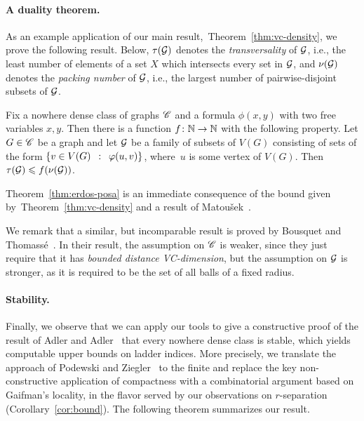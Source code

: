 \paragraph{A duality theorem.}
As an example application of our main result,~Theorem~\ref{thm:vc-density}, we prove the following
 result. Below, $\tau(\cal G)$ denotes the \emph{transversality} of $\cal G$, i.e., the least number of elements of a set $X$ which intersects every set in $\cal G$,
and $\nu(\cal G)$ denotes the \emph{packing number} of $\cal G$, i.e., the largest number of pairwise-disjoint subsets of $\cal G$.
 
\setcounter{ep}{\value{theorem}}
\begin{theorem}\label{thm:erdos-posa}
	Fix a nowhere dense class of graphs $\CCC$ and a 
	formula $\phi(x,y)$ with two free variables $x,y$.
	Then there is a function $f\from \N\to\N$ with the following property.
	Let $G\in \CCC$ be a graph and let $\cal G$
	be a family of subsets of $V(G)$ consisting of sets of the form $\setof{v\in V(G)}{\phi(u, v)}$, where~$u$ is some vertex of $V(G)$.
Then~$\tau({\cal G})\le f(\nu(\cal G))$.
\end{theorem}
\noindent Theorem~\ref{thm:erdos-posa} is an immediate consequence of the bound given by~Theorem~\ref{thm:vc-density} and a result of Matou{\v s}ek~\cite{Matousek:2004:BVI:1005787.1005789}.

We remark that a similar, but incomparable result
is proved by Bousquet and Thomass{\'e}~\cite{BousquetT15}.
In their result, the assumption on $\CCC$ is weaker, since they just require that it has \emph{bounded distance VC-dimension}, 
but the assumption on   $\cal G$ is stronger, as it is required to be the set of all balls of a fixed radius.





\paragraph{Stability.}
Finally, we observe that we can apply our  tools to give a constructive proof of the result of Adler and Adler~\cite{adler2014interpreting}
that every nowhere dense class is stable, which yields computable upper bounds on ladder indices.
More precisely, we translate the approach of Podewski and Ziegler~\cite{podewski1978stable} to the finite
and replace the key non-constructive application of compactness with a combinatorial argument based on Gaifman's locality,
in the flavor served by our observations on $r$-separation (Corollary~\ref{cor:bound}).
The following theorem summarizes our result.

